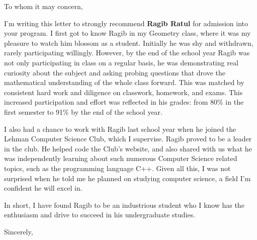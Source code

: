\documentclass{letter}
\begin{document}
\begin{letter}{}
\opening{To whom it may concern,}

I'm writing this letter to strongly recommend  \textbf{Ragib Ratul} for admission into your program.  
I first got to know Ragib in my Geometry class, where it was my pleasure to watch him blossom as a student. Initially he was  shy and withdrawn, rarely participating willingly.
However, by the end of the school year Ragib was not only participating in class on a regular basis, he was demonstrating real curiosity about the subject and asking probing questions that drove the mathematical understanding of the whole class forward. This  was matched by consistent hard work and diligence on classwork, homework, and exams. This increased participation and effort was reflected in his grades: from 80\% in the first semester to 91\% by the end of the school year.

I also had a chance to work with Ragib last school year when he joined the Lehman Computer Science Club, which I supervise.   Ragib proved to be a leader in the club.  He helped code the Club's website, and also shared with us  what he was  independently learning about such numerous Computer Science related topics, such as the programming language C++.  Given all this, I was not surprised when he told me he planned on studying computer science, a field I'm confident he will excel in.

In short, I have found Ragib to be  an industrious student who I know has the enthusiasm and drive to succeed in his undergraduate studies.    


\closing{Sincerely,}

\end{letter}
\end{document}
